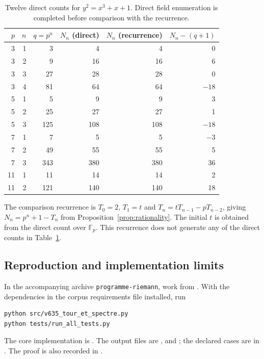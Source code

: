 \documentclass[11pt]{amsart}
\theoremstyle{definition}
\theoremstyle{remark}
\newcommand{\F}{\mathbb F}
\begin{document}
\begin{table}[ht]
\centering\small
\begin{tabular}{rrrrrr}
\toprule
$p$ & $n$ & $q=p^n$ & $N_n$ (direct) & $N_n$ (recurrence) &
 $N_n-(q+1)$\\
\midrule
3 & 1 & 3 & 4 & 4 & 0\\
3 & 2 & 9 & 16 & 16 & 6\\
3 & 3 & 27 & 28 & 28 & 0\\
3 & 4 & 81 & 64 & 64 & $-18$\\
5 & 1 & 5 & 9 & 9 & 3\\
5 & 2 & 25 & 27 & 27 & 1\\
5 & 3 & 125 & 108 & 108 & $-18$\\
7 & 1 & 7 & 5 & 5 & $-3$\\
7 & 2 & 49 & 55 & 55 & 5\\
7 & 3 & 343 & 380 & 380 & 36\\
11 & 1 & 11 & 14 & 14 & 2\\
11 & 2 & 121 & 140 & 140 & 18\\
\bottomrule
\end{tabular}
\caption{Twelve direct counts for $y^2=x^3+x+1$. Direct field enumeration is completed before comparison with the recurrence.}
\label{tab:counts}
\end{table}

The comparison recurrence is $T_0=2$, $T_1=t$ and $T_n=tT_{n-1}-pT_{n-2}$, giving $N_n=p^n+1-T_n$ from Proposition~\ref{prop:rationality}. The initial $t$ is obtained from the direct count over $\F_p$. This recurrence does not generate any of the direct counts in Table~\ref{tab:counts}.

\subsection*{Reproduction and implementation limits}
In the accompanying archive \texttt{programme-riemann}, work from . With the dependencies in the corpus requirements file installed, run
\begin{verbatim}
python src/v635_tour_et_spectre.py
python tests/run_all_tests.py
\end{verbatim}
The core implementation is . The output files are ,  and ; the declared cases are in . The proof is also recorded in .
\end{document}
